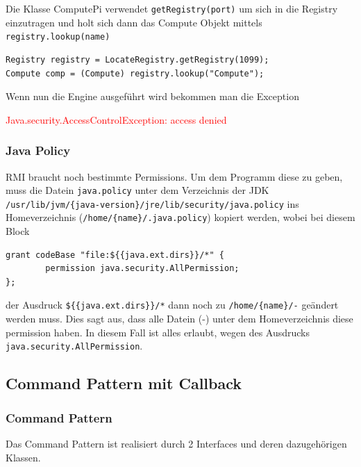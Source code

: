 Die Klasse ComputePi verwendet \texttt{getRegistry(port)} um sich in die Registry
einzutragen und holt sich dann das Compute Objekt mittels \texttt{registry.lookup(name)}

\begin{lstlisting}[style=Java, caption=Compute]
Registry registry = LocateRegistry.getRegistry(1099);
Compute comp = (Compute) registry.lookup("Compute");
\end{lstlisting}

Wenn nun die Engine ausgef\"uhrt wird bekommen man die Exception

\textcolor{red}{Java.security.AccessControlException: access denied}

\clearpage

\subsubsection{Java Policy}

RMI braucht noch bestimmte Permissions. Um dem Programm diese zu geben, muss die Datein \texttt{java.policy} unter dem Verzeichnis der JDK \texttt{/usr/lib/jvm/\{java-version\}/jre/lib/security/java.policy} ins Homeverzeichnis (\texttt{/home/\{name\}/.java.policy}) kopiert werden, wobei bei diesem Block\\

\begin{lstlisting}[caption=java.policy]
grant codeBase "file:${{java.ext.dirs}}/*" {
        permission java.security.AllPermission;
};
\end{lstlisting}

der Ausdruck \texttt{\$\{\{java.ext.dirs\}\}/*} dann noch zu \texttt{/home/\{name\}/-} ge\"andert werden muss. Dies sagt aus, dass alle Datein (-) unter dem Homeverzeichnis diese permission haben. In diesem Fall ist alles erlaubt, wegen des Ausdrucks \texttt{java.security.AllPermission}.

\clearpage

\subsection{Command Pattern mit Callback}

\subsubsection{Command Pattern}

Das Command Pattern ist realisiert durch 2 Interfaces und deren dazugeh\"origen Klassen.

